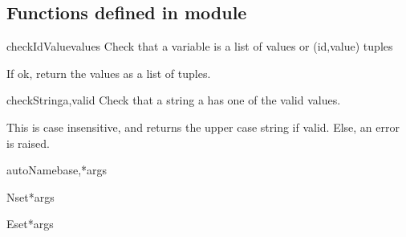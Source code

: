 \subsection{Functions defined in module }

\begin{funcdesc}{checkIdValue}{values}
Check that a variable is a list of values or (id,value) tuples

    If ok, return the values as a list of tuples.
    
\end{funcdesc}

\begin{funcdesc}{checkString}{a,valid}
Check that a string a has one of the valid values.

    This is case insensitive, and returns the upper case string if valid.
    Else, an error is raised.
    
\end{funcdesc}

\begin{funcdesc}{autoName}{base,*args}

\end{funcdesc}

\begin{funcdesc}{Nset}{*args}

\end{funcdesc}

\begin{funcdesc}{Eset}{*args}

\end{funcdesc}


